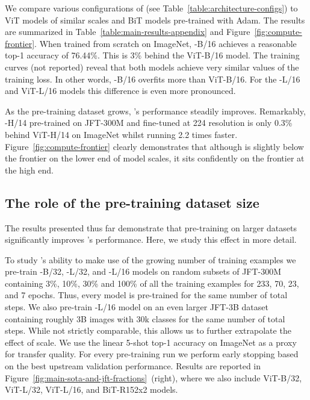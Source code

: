 We compare various configurations of \name{} (see Table~\ref{table:architecture-configs}) to ViT models of similar scales and BiT models pre-trained with Adam. The results are summarized in Table~\ref{table:main-results-appendix} and Figure~\ref{fig:compute-frontier}.
When trained from scratch on ImageNet, \name{}-B/16 achieves a reasonable top-1 accuracy of 76.44\%. This is 3\% behind the ViT-B/16 model. The training curves (not reported) reveal that both models achieve very similar values of the training loss.
In other words, \name{}-B/16 overfits more than ViT-B/16.
For the \name{}-L/16 and ViT-L/16 models this difference is even more pronounced.

As the pre-training dataset grows, \name{}'s performance steadily improves.
Remarkably, \name{}-H/14 pre-trained on JFT-300M and fine-tuned at 224 resolution is only 0.3\% behind ViT-H/14 on ImageNet whilst running 2.2 times faster.
Figure~\ref{fig:compute-frontier} clearly demonstrates that although \name{} is slightly below the frontier on the lower end of model scales, it sits confidently on the frontier at the high end. 

\subsection{The role of the pre-training dataset size}

The results presented thus far demonstrate that pre-training on larger datasets significantly improves \name{}'s performance. Here, we study this effect in more detail.

To study \name{}'s ability to make use of the growing number of training examples we pre-train \name{}-B/32, \name{}-L/32, and \name{}-L/16 models on random subsets of JFT-300M containing 3\%, 10\%, 30\% and 100\% of all the training examples for 233, 70, 23, and 7 epochs. Thus, every model is pre-trained for the same number of total steps.
We also pre-train \name{}-L/16 model on an even larger JFT-3B dataset \cite{vitg} containing roughly 3B images with 30k classes for the same number of total steps. While not strictly comparable, this allows us to further extrapolate the effect of scale.
We use the linear 5-shot top-1 accuracy on ImageNet as a proxy for transfer quality.
For every pre-training run we perform early stopping based on the best upstream validation performance.
Results are reported in Figure~\ref{fig:main-sota-and-jft-fractions}~(right), where we also include ViT-B/32, ViT-L/32, ViT-L/16, and BiT-R152x2 models. 

